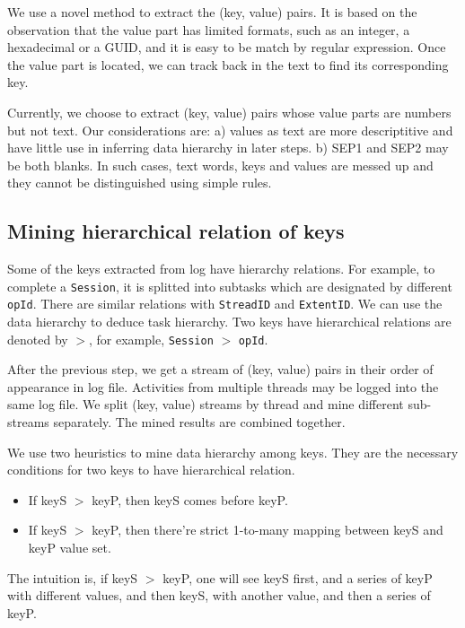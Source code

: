 We use a novel method to extract the (key, value) pairs. It
is based on the observation that the value part has limited
formats, such as an integer, a hexadecimal or a GUID, and it
is easy to be match by regular expression. Once the value
part is located, we can track back in the text to find its
corresponding key.

Currently, we choose to extract (key, value) pairs whose
value parts are numbers but not text. Our considerations
are: a) values as text are more descriptitive and have
little use in inferring data hierarchy in later steps. b)
SEP1 and SEP2 may be both blanks. In such cases,
text words, keys and values are messed up and they cannot be
distinguished using simple rules.


\subsection{Mining hierarchical relation of keys}

Some of the keys extracted from log have hierarchy
relations. For example, to complete a \texttt{Session}, it
is splitted into subtasks which are designated by different
\texttt{opId}. There are similar relations with
\texttt{StreadID} and \texttt{ExtentID}. We can use the
data hierarchy to deduce task hierarchy. Two keys have
hierarchical relations are denoted by $>$, for example,
\texttt{Session} $>$ \texttt{opId}.

After the previous step, we get a stream of (key, value)
pairs in their order of appearance in log file. Activities
from multiple threads may be logged into the same log file.
We split (key, value) streams by thread and mine different
sub-streams separately. The mined results are combined
together.

We use two heuristics to mine data hierarchy among keys.
They are the necessary conditions for two keys to have
hierarchical relation.
\begin{itemize}
\item If keyS $>$ keyP, then keyS comes before keyP.
\item If keyS $>$ keyP, then there're strict 1-to-many
mapping between keyS and keyP value set.
\end{itemize}
The intuition is, if keyS $>$ keyP, one will see keyS first,
and a series of keyP with different values, and then keyS,
with another value, and then a series of keyP. 

